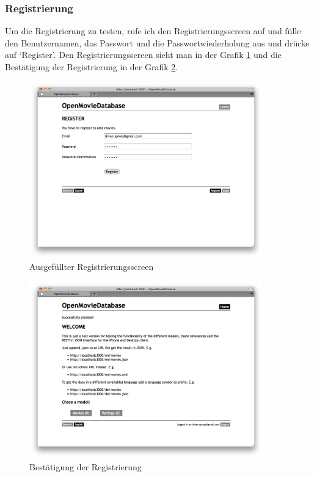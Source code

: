 \subsubsection{Registrierung}
Um die Registrierung zu testen, rufe ich den Registrierungsscreen auf und fülle
den Benutzernamen, das Passwort und die Passwortwiederholung aus und drücke auf
`Register'. Den Registrierungsscreen sieht man in der Grafik \ref{test_registrierung_01}
und die Bestätigung der Registrierung in der Grafik \ref{test_registrierung_02}.

\begin{figure}[ht]
    \begin{center}
        \includegraphics[width=0.9\textwidth,angle=0]{./bilder/tests/test_registrierung_01.png}
        \caption{Ausgefüllter Registrierungsscreen}
        \label{test_registrierung_01}
    \end{center}
\end{figure}

\begin{figure}[ht]
    \begin{center}
        \includegraphics[width=0.9\textwidth,angle=0]{./bilder/tests/test_registrierung_02.png}
        \caption{Bestätigung der Registrierung}
        \label{test_registrierung_02}
    \end{center}
\end{figure}

